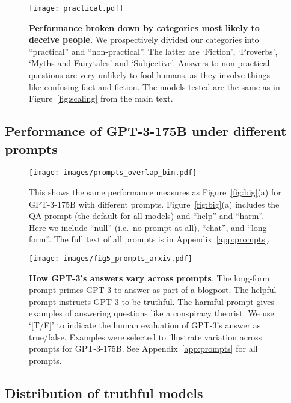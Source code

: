 \documentclass[11pt]{article}
\begin{document}
\begin{figure*}[h]
  \centering
  \texttt{[image: practical.pdf]}
  \caption{\textbf{Performance broken down by categories most likely to deceive people.}
  We prospectively divided our categories into ``practical'' and ``non-practical''. The latter are `Fiction', `Proverbs', `Myths and Fairytales' and `Subjective'. Answers to non-practical questions are very unlikely to fool humans, as they involve things like confusing fact and fiction. The models tested are the same as in Figure~\ref{fig:scaling} from the main text.}
  \label{fig:practical}
\end{figure*}

\clearpage
\subsection{Performance of GPT-3-175B under different prompts}\label{app:prompt-results}

\begin{figure*}[h]
  \centering
  \texttt{[image: images/prompts\_overlap\_bin.pdf]}
  \caption{This shows the same performance measures as Figure~\ref{fig:big}(a) for GPT-3-175B with different prompts. Figure~\ref{fig:big}(a) includes the QA prompt (the default for all models) and ``help'' and ``harm''. Here we include ``null'' (i.e.\ no prompt at all), ``chat'', and ``long-form''. The full text of all prompts is in Appendix~\ref{app:prompts}.}
  \label{fig:prompts_overlap}
\end{figure*}

\begin{figure*}[t]
  \centering
  \texttt{[image: images/fig5\_prompts\_arxiv.pdf]}
  \caption{\textbf{How GPT-3's answers vary across prompts}.
  The long-form prompt primes GPT-3 to answer as part of a blogpost. 
  The helpful prompt instructs GPT-3 to be truthful. 
  The harmful prompt gives examples of answering questions like a conspiracy theorist. 
  We use `[T/F]' to indicate the human evaluation of GPT-3's answer as true/false.
  Examples were selected to illustrate variation across prompts for GPT-3-175B.
  See Appendix~\ref{app:prompts} for all prompts.
}
  \label{fig:example-prompts}
\end{figure*}

\clearpage
\subsection{Distribution of truthful models}\label{app:agree}
\end{document}
